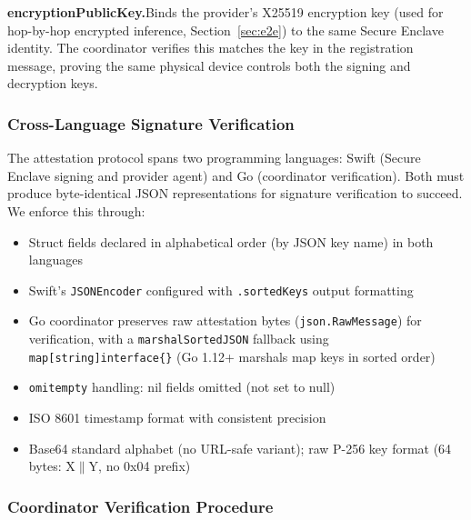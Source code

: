 \documentclass[10pt,twocolumn,letterpaper]{article}
\begin{document}
\textbf{encryptionPublicKey.}\quad Binds the provider's X25519 encryption key (used for hop-by-hop encrypted inference, Section~\ref{sec:e2e}) to the same Secure Enclave identity. The coordinator verifies this matches the key in the registration message, proving the same physical device controls both the signing and decryption keys.

\subsubsection{Cross-Language Signature Verification}

The attestation protocol spans two programming languages: Swift (Secure Enclave signing and provider agent) and Go (coordinator verification). Both must produce byte-identical JSON representations for signature verification to succeed. We enforce this through:
\begin{itemize}[leftmargin=*,itemsep=1pt]
    \item Struct fields declared in alphabetical order (by JSON key name) in both languages
    \item Swift's \texttt{JSONEncoder} configured with \texttt{.sortedKeys} output formatting
    \item Go coordinator preserves raw attestation bytes (\texttt{json.RawMessage}) for verification, with a \texttt{marshalSortedJSON} fallback using \texttt{map[string]interface\{\}} (Go 1.12+ marshals map keys in sorted order)
    \item \texttt{omitempty} handling: nil fields omitted (not set to null)
    \item ISO 8601 timestamp format with consistent precision
    \item Base64 standard alphabet (no URL-safe variant); raw P-256 key format (64 bytes: X$\|$Y, no 0x04 prefix)
\end{itemize}

\subsubsection{Coordinator Verification Procedure}
\end{document}
